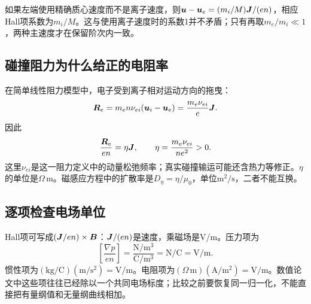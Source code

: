 如果左端使用精确质心速度而不是离子速度，则$\bm{u}-\bm{u}_e=(m_i/M)\bm{J}/(en)$，相应Hall项系数为$m_i/M$。这与使用离子速度时的系数1并不矛盾；只有再取$m_e/m_i\ll1$，两种主速度才在保留阶次内一致。

\subsection{碰撞阻力为什么给正的电阻率}
在简单线性阻力模型中，电子受到离子相对运动方向的拖曳：
\begin{equation}
\bm{R}_e=m_en\nu_{ei}(\bm{u}_i-\bm{u}_e)
=\frac{m_e\nu_{ei}}e\bm{J}.
\end{equation}
因此
\begin{equation}
\frac{\bm{R}_e}{en}=\eta\bm{J},
\qquad \eta=\frac{m_e\nu_{ei}}{ne^2}>0.
\label{hall:eq:resistivity}
\end{equation}
这里$\nu_{ei}$是这一阻力定义中的动量松弛频率；真实碰撞输运可能还含热力等修正。$\eta$的单位是$\Omega\,\mathrm m$。磁感应方程中的扩散率是$D_\eta=\eta/\mu_0$，单位$\mathrm{m^2/s}$，二者不能互换。

\subsection{逐项检查电场单位}
Hall项可写成$(\bm{J}/en)\times\bm{B}$：$\bm{J}/(en)$是速度，乘磁场是V/m。压力项为
\begin{equation}
\left[\frac{\nabla p}{en}\right]
=\frac{\mathrm{N/m^3}}{\mathrm{C/m^3}}
=\mathrm{N/C}=\mathrm{V/m}.
\end{equation}
惯性项为$(\mathrm{kg/C})(\mathrm{m/s^2})=\mathrm{V/m}$。电阻项为$(\Omega\,\mathrm m)(\mathrm{A/m^2})=\mathrm{V/m}$。数值论文中这些项往往已经除以一个共同电场标度；比较之前要恢复同一归一化，不能直接把有量纲值和无量纲曲线相加。

